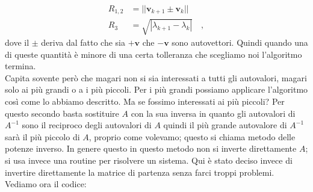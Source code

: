 \documentclass[10pt,a4paper]{article}
\begin{document}
\begin{equation}
\begin{split}
R_{1, 2} &= ||\textbf{v}_{k+1} \pm \textbf{v}_k || \\
R_3 &= \sqrt{|\lambda_{k+1} - \lambda_k|} \quad,
\end{split}
\end{equation}
dove il $\pm$ deriva dal fatto che sia $+ \textbf{v}$ che $-\textbf{v}$ sono autovettori. Quindi quando una di queste quantità è minore di una certa tolleranza che scegliamo noi l'algoritmo termina.\\
Capita sovente però che magari non si sia interessati a tutti gli autovalori, magari solo ai più grandi o a i più piccoli. Per i più grandi possiamo applicare l'algoritmo così come lo abbiamo descritto. Ma se fossimo interessati ai più piccoli? Per questo secondo basta sostituire $A$ con la sua inversa in quanto gli autovalori di $A^{-1}$ sono il reciproco degli autovalori di $A$ quindi il più grande autovalore di $A^{-1}$ sarà il più piccolo di $A$, proprio come volevamo; questo si chiama metodo delle potenze inverso. In genere questo in questo metodo non si inverte direttamente $A$; si usa invece una routine per risolvere un sistema. Qui è stato deciso invece di invertire direttamente la matrice di partenza senza farci troppi problemi. Vediamo ora il codice:
\end{document}

